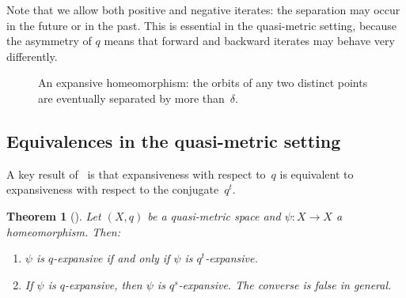 \documentclass[11pt,a4paper]{article}
\theoremstyle{plain}
\newtheorem{theoreminner}{Theorem}[section]
\theoremstyle{definition}
\newenvironment{theorem}[1][]{\begin{theoreminner}[#1]}{\end{theoreminner}}
\begin{document}
Note that we allow both positive and negative iterates: the
separation may occur in the future or in the past.  This is essential
in the quasi-metric setting, because the asymmetry of $q$ means that
forward and backward iterates may behave very differently.

\begin{figure}[H]
\centering
{}
\caption{An expansive homeomorphism: the orbits of any two distinct
points are eventually separated by more than~$\delta$.}
\label{fig:expansive-idea}
\end{figure}


\subsection{Equivalences in the quasi-metric setting}

A key result of~\cite{olela2024} is that expansiveness with respect
to~$q$ is equivalent to expansiveness with respect to the conjugate~$q^t$.

\begin{theorem}[\cite{olela2024}]\label{thm:olela-equiv}
Let $(X,q)$ be a quasi-metric space and $\psi\colon X\to X$ a
homeomorphism.  Then:
\begin{enumerate}[label=\textup{(\roman*)}]
  \item $\psi$ is $q$-expansive if and only if $\psi$ is $q^t$-expansive.
  \item If $\psi$ is $q$-expansive, then $\psi$ is $q^s$-expansive.
    The converse is false in general.
\end{enumerate}
\end{theorem}
\end{document}
